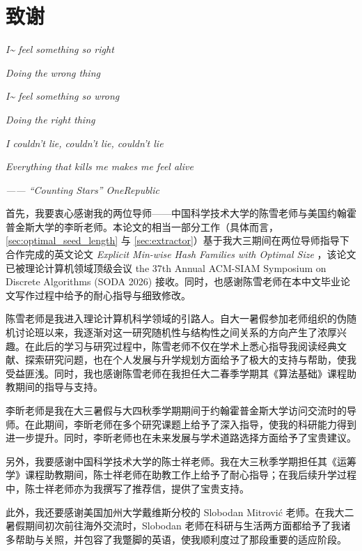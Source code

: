 \section*{致谢}

\textit{I\~{} feel something so right}

\textit{Doing the wrong thing}

\textit{I\~{} feel something so wrong}

\textit{Doing the right thing}

\textit{I couldn't lie, couldn't lie, couldn't lie}

\textit{Everything that kills me makes me feel alive}

\hfill \textit{------ ``Counting Stars'' OneRepublic}

\medskip

首先，我要衷心感谢我的两位导师——中国科学技术大学的陈雪老师与美国约翰霍普金斯大学的李昕老师。本论文的相当一部分工作（具体而言，\ref{sec:optimal_seed_length} 与 \ref{sec:extractor}）基于我大三期间在两位导师指导下合作完成的英文论文 \textit{Explicit Min-wise Hash Families with Optimal Size} \cite{xue_shengtang_xin_min_wise}，该论文已被理论计算机领域顶级会议 the 37th Annual ACM-SIAM Symposium on Discrete Algorithms (SODA 2026) 接收。同时，也感谢陈雪老师在本中文毕业论文写作过程中给予的耐心指导与细致修改。

陈雪老师是我进入理论计算机科学领域的引路人。自大一暑假参加老师组织的伪随机讨论班以来，我逐渐对这一研究随机性与结构性之间关系的方向产生了浓厚兴趣。在此后的学习与研究过程中，陈雪老师不仅在学术上悉心指导我阅读经典文献、探索研究问题，也在个人发展与升学规划方面给予了极大的支持与帮助，使我受益匪浅。同时，我也感谢陈雪老师在我担任大二春季学期其《算法基础》课程助教期间的指导与支持。

李昕老师是我在大三暑假与大四秋季学期期间于约翰霍普金斯大学访问交流时的导师。在此期间，李昕老师在多个研究课题上给予了深入指导，使我的科研能力得到进一步提升。同时，李昕老师也在未来发展与学术道路选择方面给予了宝贵建议。

另外，我要感谢中国科学技术大学的陈士祥老师。我在大三秋季学期担任其《运筹学》课程助教期间，陈士祥老师在助教工作上给予了耐心指导；在我后续升学过程中，陈士祥老师亦为我撰写了推荐信，提供了宝贵支持。

此外，我还要感谢美国加州大学戴维斯分校的 Slobodan Mitrovi\'{c} 老师。在我大二暑假期间初次前往海外交流时，Slobodan 老师在科研与生活两方面都给予了我诸多帮助与关照，并包容了我蹩脚的英语，使我顺利度过了那段重要的适应阶段。

